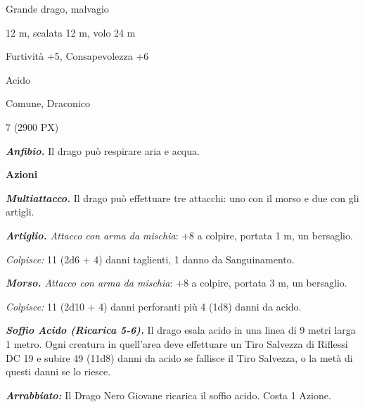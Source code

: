 \begin{multicols}{2}
{
\begin{description}[noitemsep, topsep=0pt, parsep=0pt, partopsep=0pt, itemsep=1pt, leftmargin=2.35cm,  labelwidth=2.2cm, itemindent=0cm, listparindent=0pt] %
\setlength{\baselineskip}{10pt}
\item[\textbf{Taglia/Tipo}] Grande drago, malvagio
\item[\textbf{Caratt.}] 
\item[\textbf{Punti Ferita}] 
\item[\textbf{Movimento}] 12 m, scalata 12 m, volo 24 m
\item[\textbf{Tiri Salvez.}] 
\item[\textbf{Comp.}] Furtività +5, Consapevolezza +6
\item[\textbf{Imm. Danni}] Acido
\item[\textbf{Sensi}] 
\item[\textbf{Linguaggi}] Comune, Draconico
\item[\textbf{Sfida}] 7 (2900 PX)
\end{description}
\smallskip

\emph{\textbf{Anfibio.}} Il drago può respirare aria e acqua.

\textbf{Azioni}

\emph{\textbf{Multiattacco.}} Il drago può effettuare tre attacchi: uno con il morso e due con gli artigli.

\emph{\textbf{Artiglio.} Attacco con arma da mischia}: +8 a colpire, portata 1 m, un bersaglio.

\emph{Colpisce:} 11 (2d6 + 4) danni taglienti, 1 danno da Sanguinamento.

\emph{\textbf{Morso.} Attacco con arma da mischia}: +8 a colpire, portata 3 m, un bersaglio.

\emph{Colpisce:} 11 (2d10 + 4) danni perforanti più 4 (1d8) danni da acido.

\emph{\textbf{Soffio Acido (Ricarica 5-6).}} Il drago esala acido in una linea di 9 metri larga 1 metro. Ogni creatura in quell'area deve effettuare un Tiro Salvezza di Riflessi DC 19 e subire 49 (11d8) danni da acido se fallisce il Tiro Salvezza, o la metà di questi danni se lo riesce.

\emph{\textbf{Arrabbiato:}} Il Drago Nero Giovane ricarica il soffio acido. Costa 1 Azione.

}
\end{multicols}
